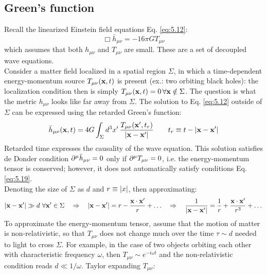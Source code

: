 \subsection{Green's function}

Recall the linearized Einstein field equations Eq. \ref{eq:5.12}:
\begin{equation*}
  \Box \bar{h}_{\mu \nu} = -16\pi G T_{\mu \nu}
\end{equation*}
which assumes that both $ h_{\mu \nu} $ and $ T_{\mu \nu} $ are small. These are a set of decoupled wave equations.\\
Consider a matter field localized in a spatial region $ \Sigma $, in which a time-dependent energy-momentum source $ T_{\mu \nu}(\mathbf{x},t) $ is present (ex.: two orbiting black holes): the localization condition then is simply $ T_{\mu \nu}(\mathbf{x},t) = 0 \,\forall \mathbf{x} \notin \Sigma $. The question is what the metric $ h_{\mu \nu} $ looks like far away from $ \Sigma $. The solution to Eq. \ref{eq:5.12} outside of $ \Sigma $ can be expressed using the retarded Green's function:
\begin{equation}
  \bar{h}_{\mu \nu}(\mathbf{x},t) = 4G \int_\Sigma d^3 x'\, \frac{T_{\mu \nu}(\mathbf{x}',t_r)}{\left\lvert\mathbf{x} - \mathbf{x}'\right\rvert}
  \qquad t_r \equiv t - \left\lvert\mathbf{x} - \mathbf{x}'\right\rvert
  \label{eq:5.25}
\end{equation}
Retarded time expresses the causality of the wave equation. This solution satisfies de Donder condition $ \partial^\mu \bar{h}_{\mu \nu} = 0 $ only if $ \partial^\mu T_{\mu \nu} = 0 $, i.e. the energy-momentum tensor is conserved; however, it does not automatically satisfy conditions Eq. \ref{eq:5.19}.\\
Denoting the size of $ \Sigma $ as $ d $ and $ r \equiv \left\lvert x\right\rvert $, then approximating:
\begin{equation*}
  \left\lvert\mathbf{x} - \mathbf{x}'\right\rvert \gg d \,\,\forall \mathbf{x}' \in \Sigma
  \quad \Rightarrow \quad
  \left\lvert\mathbf{x} - \mathbf{x}'\right\rvert = r - \frac{\mathbf{x} \cdot \mathbf{x}'}{r} + \dots
  \quad \Rightarrow \quad
  \frac{1}{\left\lvert\mathbf{x} - \mathbf{x}'\right\rvert} = \frac{1}{r} + \frac{\mathbf{x} \cdot \mathbf{x}'}{r^3} + \dots
\end{equation*}
To approximate the energy-momentum tensor, assume that the motion of matter is non-relativistic, so that $ T_{\mu \nu} $ does not change much over the time $ \tau \sim d $ needed to light to cross $ \Sigma $. For example, in the case of two objects orbiting each other with characteristic frequency $ \omega $, then $ T_{\mu \nu} \sim e^{-i \omega t} $ and the non-relativistic condition reads $ d \ll 1/\omega $. Taylor expanding $ T_{\mu \nu} $:
